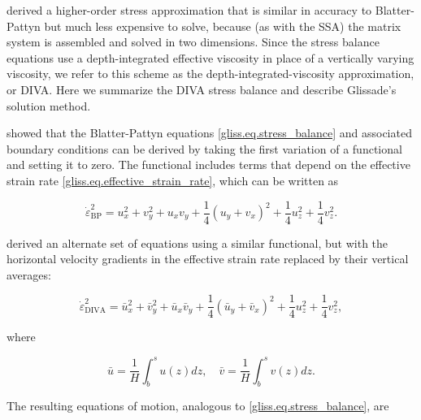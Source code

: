 {\citet{Goldberg2011} derived a higher-order stress approximation that is similar
in accuracy to Blatter-Pattyn but much less expensive to solve, because (as with the SSA)
the matrix system is assembled and solved in two dimensions. Since the stress balance
equations use a depth-integrated effective viscosity in place of a vertically varying viscosity,
we refer to this scheme as the depth-integrated-viscosity approximation, or DIVA.
Here we summarize the DIVA stress balance and describe Glissade's solution method.

\citet{DUKOWICZ:2010wb} showed that the Blatter-Pattyn equations \eqref{gliss.eq.stress_balance} 
and associated boundary conditions can be derived by taking the first variation of a functional
and setting it to zero. The functional includes terms that depend on the effective strain rate
\eqref{gliss.eq.effective_strain_rate}, which can be written as

\begin{equation}
  \label{gliss.eq.effstrainrate_BP}
  \dot{\varepsilon }_{\mathrm{BP}}^{2} = u_{x}^{2} + v_{y}^{2} + {{u}_{x}}{{v}_{y}} 
                              + \frac{1}{4}{{\left( {{u}_{y}}+{{v}_{x}} \right)}^{2}}
                              + \frac{1}{4}u_{z}^{2} + \frac{1}{4}v_{z}^{2}.
\end{equation}

\noindent
\citet{Goldberg2011} derived an alternate set of equations using a similar functional,
but with the horizontal velocity gradients in the effective strain rate replaced by
their vertical averages:

\begin{equation}
  \label{gliss.eq.effstrainrate_DIVA}
  \dot{\varepsilon }_{\mathrm{DIVA}}^{2} = 
    \bar{u}_{x}^{2} + \bar{v}_{y}^{2} + {{\bar{u}}_{x}}{{\bar{v}}_{y}} 
    + \frac{1}{4}{{\left( {{\bar{u}}_{y}}+{{\bar{v}}_{x}} \right)}^{2}}
    + \frac{1}{4}u_{z}^{2} + \frac{1}{4}v_{z}^{2},
\end{equation}

\noindent
where

\begin{equation}
  \label{gliss.eq.vert_avg_velocity}
  \bar{u} = \frac{1}{H}\int_{b}^{s}{u(z)dz}, \quad \bar{v} = \frac{1}{H}\int_{b}^{s}{v(z)dz}.
\end{equation}

\noindent
The resulting equations of motion, analogous to \eqref{gliss.eq.stress_balance}, are

}
